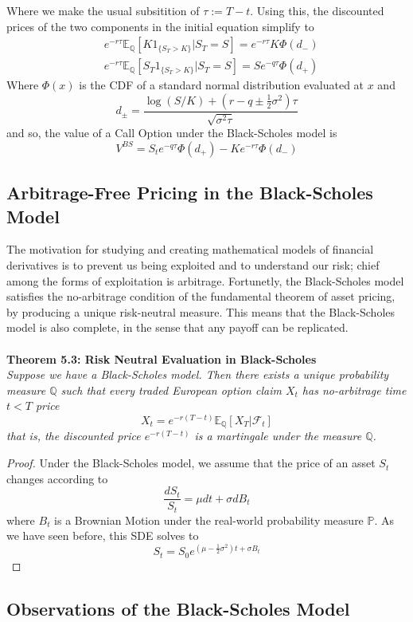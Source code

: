 \documentclass{article}
\begin{document}
Where we make the usual subsitition of $\tau:= T-t$. Using this, the discounted prices of the two components in the initial equation simplify to
\begin{align*}
    & e^{-r\tau}\mathbb{E}_{\mathbb{Q}}[ K 1_{\{S_T>K\}}|S_T = S] = e^{-r\tau} K \Phi(d_{-}) \\
    & e^{-r\tau}\mathbb{E}_{\mathbb{Q}}[ S_T 1_{\{S_T>K\}}|S_T = S] = S e^{-q\tau} \Phi(d_{+})
\end{align*}
Where $\Phi(x)$ is the CDF of a standard normal distribution evaluated at $x$ and 
$$d_{\pm} = \frac{\log(S/K) + (r-q \pm \frac{1}{2}\sigma^2)\tau}{\sqrt{\sigma^2\tau}}$$
and so, the value of a Call Option under the Black-Scholes model is
$$V^{BS} = S_t e^{-q\tau}\Phi(d_+) - Ke^{-r\tau}\Phi(d_-)$$

\subsection{Arbitrage-Free Pricing in the Black-Scholes Model}
The motivation for studying and creating mathematical models of financial derivatives is to prevent us being exploited and to understand our risk; chief among the forms of exploitation is arbitrage. Fortunetly, the Black-Scholes model satisfies the no-arbitrage condition of the fundamental theorem of asset pricing, by producing a unique risk-neutral measure. This means that the Black-Scholes model is also complete, in the sense that any payoff can be replicated. \\
\\
\textbf{Theorem 5.3: Risk Neutral Evaluation in Black-Scholes} \\
\textit{Suppose we have a Black-Scholes model. Then there exists a unique probability measure $\mathbb{Q}$ such that every traded European option claim $X_t$ has no-arbitrage time $t<T$ price 
$$X_t = e^{-r(T-t)}\mathbb{E}_{\mathbb{Q}}[X_T | \mathcal{F}_t]$$
that is, the discounted price $e^{-r(T-t)}$ is a martingale under the measure $\mathbb{Q}$.}
\begin{proof}
Under the Black-Scholes model, we assume that the price of an asset $S_t$ changes according to 
$$\frac{dS_t}{S_t} = \mu dt + \sigma dB_t$$ where $B_t$ is a Brownian Motion under the real-world probability measure $\mathbb{P}$. As we have seen before, this SDE solves to 
$$S_t = S_0 e^{(\mu - \frac{1}{2}\sigma^2)t + \sigma B_t}$$
\end{proof}

\subsection{Observations of the Black-Scholes Model}
\end{document}
